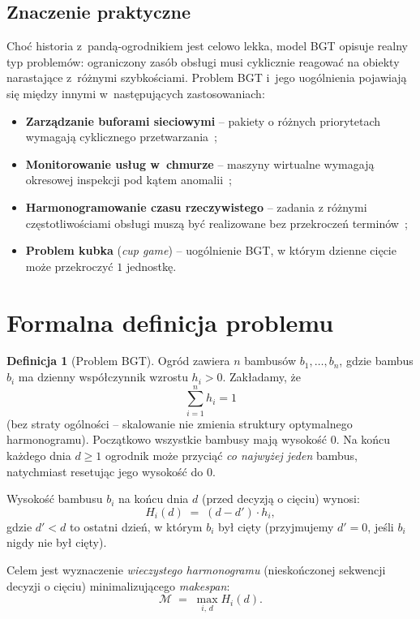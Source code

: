 \documentclass[12pt,a4paper]{article}
\theoremstyle{plain}
\theoremstyle{definition}
\newtheorem{definicja}[twierdzenie]{Definicja}
\theoremstyle{remark}
\newcommand{\makespan}{\mathcal{M}}
\begin{document}
\subsection{Znaczenie praktyczne}

Choć historia z~pandą-ogrodnikiem jest celowo lekka, model BGT opisuje
realny typ problemów: ograniczony zasób obsługi musi cyklicznie reagować
na obiekty narastające z~różnymi szybkościami. Problem BGT i~jego
uogólnienia pojawiają się między innymi w~następujących zastosowaniach:
\begin{itemize}[noitemsep]
  \item \textbf{Zarządzanie buforami sieciowymi} – pakiety o różnych
        priorytetach wymagają cyklicznego przetwarzania~\cite{goldwasser2010};
  \item \textbf{Monitorowanie usług w~chmurze} – maszyny wirtualne wymagają
        okresowej inspekcji pod kątem anomalii~\cite{alshamrani2015};
  \item \textbf{Harmonogramowanie czasu rzeczywistego} – zadania z różnymi
        częstotliwościami obsługi muszą być realizowane bez przekroczeń
        terminów~\cite{bender2020};
  \item \textbf{Problem kubka} (\emph{cup game}) – uogólnienie BGT, w którym
        dzienne cięcie może przekroczyć $1$ jednostkę.
\end{itemize}

\section{Formalna definicja problemu}

\begin{definicja}[Problem BGT]
Ogród zawiera $n$ bambusów $b_1, \ldots, b_n$, gdzie bambus $b_i$ ma
dzienny współczynnik wzrostu $h_i > 0$. Zakładamy, że
\[
  \sum_{i=1}^{n} h_i = 1
\]
(bez straty ogólności – skalowanie nie zmienia struktury optymalnego
harmonogramu). Początkowo wszystkie bambusy mają wysokość $0$. Na końcu
każdego dnia $d \geq 1$ ogrodnik może przyciąć \emph{co najwyżej jeden}
bambus, natychmiast resetując jego wysokość do $0$.

Wysokość bambusu $b_i$ na końcu dnia $d$ (przed decyzją o cięciu) wynosi:
\[
  H_i(d) \;=\; (d - d') \cdot h_i,
\]
gdzie $d' < d$ to ostatni dzień, w którym $b_i$ był cięty
(przyjmujemy $d' = 0$, jeśli $b_i$ nigdy nie był cięty).

Celem jest wyznaczenie \emph{wieczystego harmonogramu} (nieskończonej
sekwencji decyzji o cięciu) minimalizującego \emph{makespan}:
\[
  \makespan \;=\; \max_{i,\,d} H_i(d).
\]
\end{definicja}
\end{document}
